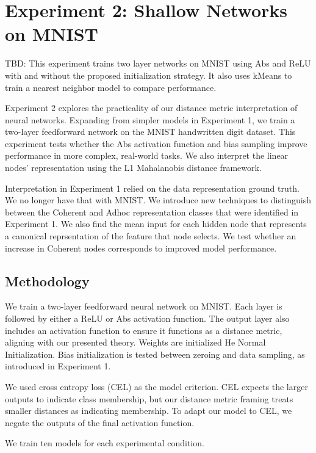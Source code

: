 
\section{Experiment 2: Shallow Networks on MNIST}
\label{sec:experiment2}

TBD: This experiment trains two layer networks on MNIST using Abs and ReLU with and without the proposed initialization strategy. It also uses kMeans to train a nearest neighbor model to compare performance.

Experiment 2 explores the practicality of our distance metric interpretation of neural networks. Expanding from simpler models in Experiment 1, we train a two-layer feedforward network on the MNIST handwritten digit dataset. This experiment tests whether the Abs activation function and bias sampling improve performance in more complex, real-world tasks. We also interpret the linear nodes' representation using the L1 Mahalanobis distance framework.

Interpretation in Experiment 1 relied on the data representation ground truth. We no longer have that with MNIST. We introduce new techniques to distinguish between the Coherent and Adhoc representation classes that were identified in Experiment 1. We also find the mean input for each hidden node that represents a canonical reprsentation of the feature that node selects. We test whether an increase in Coherent nodes corresponds to improved model performance.


\subsection{Methodology}

We train a two-layer feedforward neural network on MNIST. Each layer is followed by either a ReLU or Abs activation function. The output layer also includes an activation function to ensure it functions as a distance metric, aligning with our presented theory. Weights are initialized He Normal Initialization. Bias initialization is tested between zeroing and data sampling, as introduced in Experiment 1.

We used cross entropy loss (CEL) as the model criterion. CEL expects the larger outputs to indicate class membership, but our distance metric framing treats smaller distances as indicating membership. To adapt our model to CEL, we negate the outputs of the final activation function.

We train ten models for each experimental condition.

